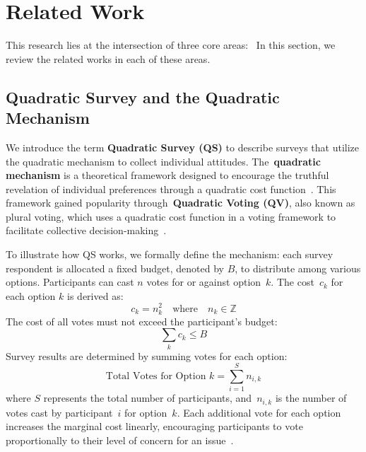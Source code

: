 \section{Related Work}
\label{sec:relatedWorks}
This research lies at the intersection of three core areas:~ In this section, we review the related works in each of these areas.



\subsection{Quadratic Survey and the Quadratic Mechanism}
We introduce the term \textbf{Quadratic Survey (QS)} to describe surveys that utilize the quadratic mechanism to collect individual attitudes. The~\textbf{quadratic mechanism} is a theoretical framework designed to encourage the truthful revelation of individual preferences through a quadratic cost function~\cite{grovesOptimalAllocationPublic1977}. This framework gained popularity through~\textbf{Quadratic Voting (QV)}, also known as plural voting, which uses a quadratic cost function in a voting framework to facilitate collective decision-making~\cite{lalley2016quadratic}.

To illustrate how QS works, we formally define the mechanism: each survey respondent is allocated a fixed budget, denoted by $B$, to distribute among various options. Participants can cast $n$ votes for or against option~$k$. The cost~$c_k$ for each option $k$ is derived as:
\begin{equation*}
c_k = n_k^2 \quad \text{where}\quad n_k \in \mathbb{Z}
\end{equation*}
The cost of all votes must not exceed the participant's budget:
\begin{equation*}
\sum_k c_k \leq B
\end{equation*}
Survey results are determined by summing votes for each option:
\begin{equation*}
\text{Total Votes for Option } k = \sum_{i=1}^{S} n_{i,k}    
\end{equation*}
where $S$ represents the total number of participants, and~$n_{i,k}$ is the number of votes cast by participant~$i$ for option~$k$. Each additional vote for each option increases the marginal cost linearly, encouraging participants to vote proportionally to their level of concern for an issue~\cite{posner2018radical}.

